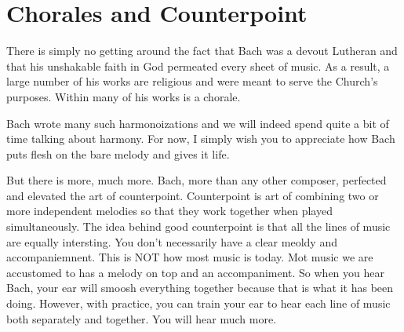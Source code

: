\chapter{Chorales and Counterpoint}
There is simply no getting around the fact that Bach was a devout Lutheran and that his unshakable faith in God permeated every sheet of music. As a result, a large number of his works are religious and were meant to serve the Church's purposes. Within many of his works is a chorale.


Bach wrote many such harmonoizations and we will indeed spend quite a bit of time talking about harmony. For now, I simply wish you to appreciate how Bach puts flesh on the bare melody and gives it life.

But there is more, much more. Bach, more than any other composer, perfected and elevated the art of counterpoint. %
Counterpoint is art of combining two or more independent melodies so that they work together when played simultaneously. The idea behind good counterpoint is that all the lines of music are equally intersting. You don't necessarily have a clear meoldy and accompaniemnent. This is NOT how most music is today. Mot music we are accustomed to has a melody on top and an accompaniment. %
So when you hear Bach, your ear will smoosh everything together because that is what it has been doing. However, with practice, you can train your ear to hear each line of music both separately and together. You will hear much more. 